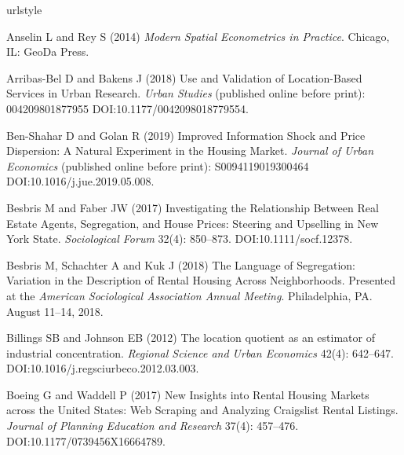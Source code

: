 \documentclass[11pt,letterpaper]{article}
\begin{document}
\begin{thebibliography}{77}
	\providecommand{\natexlab}[1]{#1}
	\providecommand{\url}[1]{\texttt{#1}}
	\providecommand{\urlprefix}{URL }
	\expandafter\ifx\csname urlstyle\endcsname\relax
	\providecommand{\doi}[1]{DOI:\discretionary{}{}{}#1}\else
	\providecommand{\doi}{DOI:\discretionary{}{}{}\begingroup
		\urlstyle{rm}\Url}\fi
	
	Anselin L and Rey S (2014) \emph{Modern {Spatial} {Econometrics} in
		{Practice}}.
	\newblock Chicago, IL: GeoDa Press.
	
	Arribas-Bel D and Bakens J (2018) Use and {Validation} of {Location}-{Based}
	{Services} in {Urban} {Research}.
	\newblock \emph{Urban Studies} (published online before print): 004209801877955 \doi{10.1177/0042098018779554}.
	
	Ben-Shahar D and Golan R (2019) Improved {Information} {Shock} and {Price}
	{Dispersion}: {A} {Natural} {Experiment} in the {Housing} {Market}.
	\newblock \emph{Journal of Urban Economics} (published online before print):
	S0094119019300464 \doi{10.1016/j.jue.2019.05.008}.
	
	Besbris M and Faber JW (2017) Investigating the {Relationship} {Between} {Real}
	{Estate} {Agents}, {Segregation}, and {House} {Prices}: {Steering} and
	{Upselling} in {New} {York} {State}.
	\newblock \emph{Sociological Forum} 32(4): 850--873.
	\newblock \doi{10.1111/socf.12378}.
	
	Besbris M, Schachter A and Kuk J (2018) The {Language} of {Segregation}:
	{Variation} in the {Description} of {Rental} {Housing} {Across}
	{Neighborhoods}.
	\newblock Presented at the \emph{American {Sociological} {Association} {Annual} {Meeting}}.
	Philadelphia, PA. August 11--14, 2018.
	
	Billings SB and Johnson EB (2012) The location quotient as an estimator of
	industrial concentration.
	\newblock \emph{Regional Science and Urban Economics} 42(4): 642--647.
	\newblock \doi{10.1016/j.regsciurbeco.2012.03.003}.
	
	Boeing G and Waddell P (2017) New {Insights} into {Rental} {Housing} {Markets}
	across the {United} {States}: {Web} {Scraping} and {Analyzing} {Craigslist}
	{Rental} {Listings}.
	\newblock \emph{Journal of Planning Education and Research} 37(4): 457--476.
	\newblock \doi{10.1177/0739456X16664789}.
	

\end{thebibliography}
\end{document}
